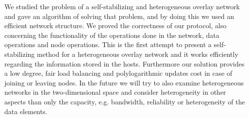 \documentclass[11pt]{article}
\begin{document}
We studied the problem of a self-stabilizing and heterogeneous overlay network and gave an algorithm of solving that problem, and by doing this we used an efficient network structure. We proved the correctness of our protocol, also concerning the functionality of the operations done in the network, data operations and node operations. This is the first attempt to present a self-stabilizing method for a heterogeneous overlay network and it works efficiently regarding the information stored in the hosts. Furthermore our solution provides a low degree, fair load balancing and polylogarithmic updates cost in case of joining or leaving nodes.
In the future we will try to also examine heterogeneous networks in the two-dimensional space and consider heterogeneity in other aspects than only the capacity, e.g. bandwidth, reliability or heterogeneity of the data elements. 
\end{document}
